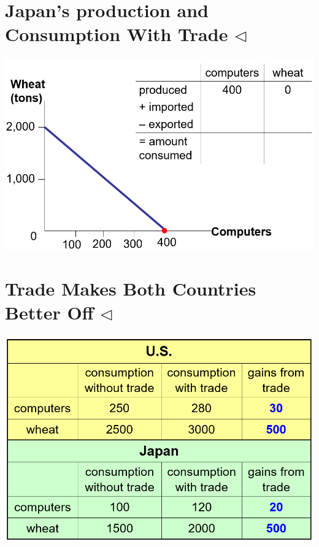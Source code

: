 \documentclass[
]{book}
\begin{document}
\hypertarget{japans-production-and-consumption-with-trade-triangleleft}{%
\section{\texorpdfstring{Japan's production and Consumption With Trade \(\triangleleft\)}{Japan's production and Consumption With Trade \textbackslash triangleleft}}\label{japans-production-and-consumption-with-trade-triangleleft}}

\includegraphics[width=\textwidth,height=0.75\textheight]{images/lesson02/part2/page20.PNG}

\hypertarget{trade-makes-both-countries-better-off-triangleleft}{%
\section{\texorpdfstring{Trade Makes Both Countries Better Off \(\triangleleft\)}{Trade Makes Both Countries Better Off \textbackslash triangleleft}}\label{trade-makes-both-countries-better-off-triangleleft}}

\includegraphics[width=\textwidth,height=0.75\textheight]{images/lesson02/part2/page21.PNG}
\end{document}
